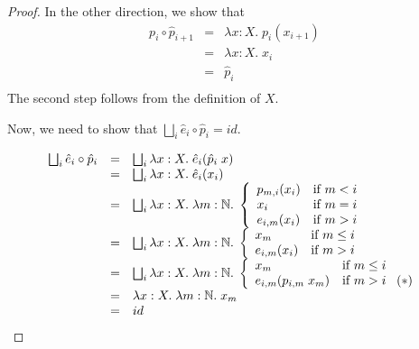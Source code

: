 \begin{proof}
\noindent In the other direction, we show that 
\begin{displaymath}
  \begin{array}{lcl}
    p_i \circ \hat{p}_{i+1} & = & \lambda x:X.\; p_i(x_{i+1}) \\ 
                           & = & \lambda x:X.\; x_i \\
                           & = & \hat{p}_i \\
  \end{array}
\end{displaymath}
The second step follows from the definition of $X$. 

Now, we need to show that $\bigsqcup_i \hat{e}_i \circ \hat{p}_i = id$. 

\begin{displaymath}
  \begin{array}{lcl}
    \bigsqcup_i \hat{e}_i \circ \hat{p}_i 
       & = & 
       \bigsqcup_i \lambda x:X.\; \hat{e}_i(\hat{p}_i \;x)
    \\
       & = & 
       \bigsqcup_i \lambda x:X.\; \hat{e}_i(x_i)
    \\
       & = & 
       \bigsqcup_i \lambda x:X.\;\lambda m:\mathbb{N}.\; 
          \left\{ 
          \begin{array}{ll}
            p_{m,i}(x_i) & \mbox{if } m < i \\
            x_i         & \mbox{if } m = i \\
            e_{i,m}(x_i) & \mbox{if } m > i \\
          \end{array}
       \right.
    \\
       & = & 
       \bigsqcup_i \lambda x:X.\;\lambda m:\mathbb{N}.\; 
          \left\{ 
          \begin{array}{ll}
            x_m         & \mbox{if } m \leq i \\
            e_{i,m}(x_i) & \mbox{if } m > i \\
          \end{array}
       \right.
    \\
       & = & 
       \bigsqcup_i \lambda x:X.\;\lambda m:\mathbb{N}.\; 
          \left\{ 
          \begin{array}{ll}
            x_m         & \mbox{if } m \leq i \\
            e_{i,m}(p_{i,m}\;x_m) & \mbox{if } m > i \mbox{\;\;\;}(*)\\
          \end{array}
       \right.
    \\
       & = & 
       \lambda x:X.\;\lambda m:\mathbb{N}.\; x_m
    \\
       & = & 
       id
  \end{array}
\end{displaymath}


\end{proof}
